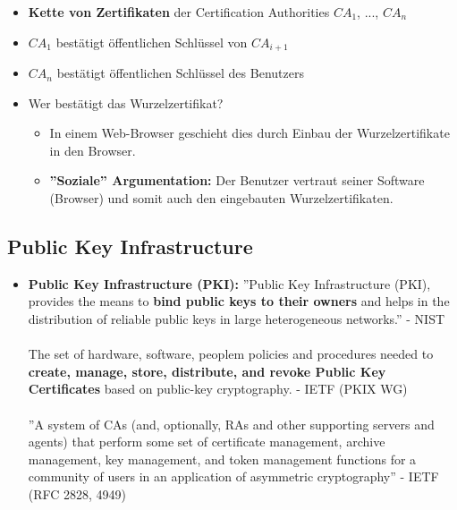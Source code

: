 \documentclass[openany]{book}
\begin{document}
\begin{itemize}
    \item \textbf{Kette von Zertifikaten} der Certification Authorities $CA_1$, ..., $CA_n$
    \item $CA_1$ bestätigt öffentlichen Schlüssel von $CA_{i+1}$
    \item $CA_n$ bestätigt öffentlichen Schlüssel des Benutzers
    \item Wer bestätigt das Wurzelzertifikat?
    \begin{itemize}
        \item In einem Web-Browser geschieht dies durch Einbau der Wurzelzertifikate in den Browser.
        \item \textbf{''Soziale'' Argumentation:} Der Benutzer vertraut seiner Software (Browser) und somit auch den eingebauten Wurzelzertifikaten.
    \end{itemize}
\end{itemize}

\subsection{Public Key Infrastructure}

\begin{itemize}
    \item \textbf{Public Key Infrastructure (PKI):} ''Public Key Infrastructure (PKI), provides the means to \textbf{bind public keys to their owners} and helps in the distribution of reliable public keys in large heterogeneous networks.'' - NIST \\ \\ The set of hardware, software, peoplem policies and procedures needed to \textbf{create, manage, store, distribute, and revoke Public Key Certificates} based on public-key cryptography. - IETF (PKIX WG) \\ \\ ''A system of CAs (and, optionally, RAs and other supporting servers and agents) that perform some set of certificate management, archive management, key management, and token management functions for a community of users in an application of asymmetric cryptography'' - IETF (RFC 2828, 4949)
\end{itemize}
\end{document}

